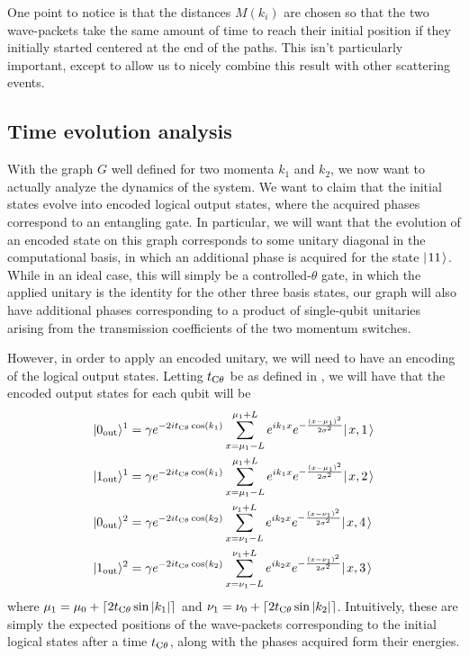 \documentclass[../thesis-main/thesis-main]{subfiles}
\begin{document}
One point to notice is that the distances $M(k_i)$ are chosen so that the two wave-packets take the same amount of time to reach their initial position if they initially started centered at the end of the paths.  This isn't particularly important, except to allow us to nicely combine this result with other scattering events.

\subsection{Time evolution analysis}

With the graph $G$ well defined for two momenta $k_1$ and $k_2$, we now want to actually analyze the dynamics of the system.  We want to claim that the initial states evolve into encoded logical output states, where the acquired phases correspond to an entangling gate.  In particular, we will want that the evolution of an encoded state on this graph corresponds to some unitary diagonal in the computational basis, in which an additional phase is acquired for the state $|\mspace{2mu} 11 \mspace{2mu} \rangle$.  While in an ideal case, this will simply be a controlled-$\theta$ gate, in which the applied unitary is the identity for the other three basis states, our graph will also have additional phases corresponding to a product of single-qubit unitaries arising from the transmission coefficients of the two momentum switches.

However, in order to apply an encoded unitary, we will need to have an encoding of the logical output states.  Letting $t_{\mathrm{C}\theta}$ be as defined in , we will have that the encoded output states for each qubit will be 
\begin{align}
  |0_\text{out}\rangle^1 &=\gamma e^{-2it_{\mathrm{C}\theta}\cos(k_1)}\sum_{x = \mu_1 -L} ^{\mu_1 + L}  e^{i k_{1} x} e^{- \frac{(x-\mu_1)^2}{2\sigma^2}} |\mspace{2mu} x,1 \mspace{2mu} \rangle
  \label{eq:cd_output_10}\\
  |1_\text{out}\rangle^1 &=\gamma e^{-2it_{\mathrm{C}\theta}\cos(k_1)} \sum_{x = \mu_1 -L} ^{\mu_1 + L}  e^{i k_{1} x} e^{- \frac{(x-\mu_1)^2}{2\sigma^2}} |\mspace{2mu} x,2 \mspace{2mu} \rangle \label{eq:cd_output_11}\\
  |0_\text{out}\rangle^2 &=\gamma e^{-2it_{\mathrm{C}\theta}\cos(k_2)} \sum_{x = \nu_1 -L} ^{\nu_1 + L}  e^{i k_{2} x} e^{- \frac{(x-\nu_1)^2}{2\sigma^2}} |\mspace{2mu} x,4 \mspace{2mu} \rangle \label{eq:cd_output_20}\\
  |1_\text{out}\rangle^2 &=\gamma e^{-2it_{\mathrm{C}\theta}\cos(k_2)} \sum_{x = \nu_1 -L} ^{\nu_1 + L}  e^{i k_{2} x} e^{- \frac{(x-\nu_1)^2}{2\sigma^2}} |\mspace{2mu} x,3 \mspace{2mu} \rangle\label{eq:cd_output_21}
\end{align}
where  $\mu_1=\mu_0 + \lceil 2t_{\mathrm{C}\theta} \sin |k_1|\rceil $ and $\nu_{1}=\nu_0 + \lceil 2 t_{\mathrm{C}\theta}\sin |k_2| \rceil$. Intuitively, these are simply the expected positions of the wave-packets corresponding to the initial logical states after a time $t_{\mathrm{C}\theta}$, along with the phases acquired form their energies.  
\end{document}
